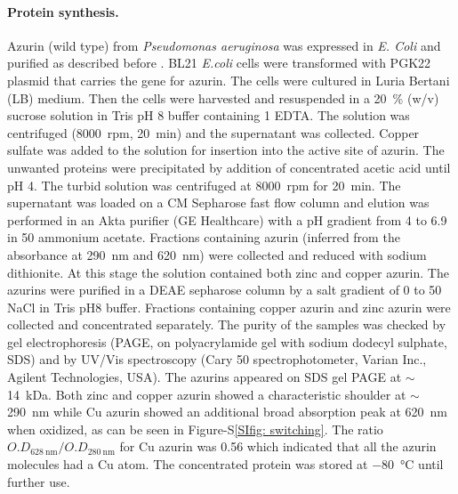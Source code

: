 \documentclass[journal=jacsat,manuscript=article]{achemso}
\begin{document}
\paragraph*{Protein synthesis.}
Azurin (wild type) from \textit{Pseudomonas aeruginosa} was expressed in \textit{E. Coli} and purified as described before \citep{kamp1990purification}.
BL21 \textit{E.coli} cells were transformed with PGK22 plasmid that carries the gene for azurin.
The cells were cultured in Luria Bertani (LB) medium.
Then the cells were harvested and resuspended in a \SI{20}{\percent} (w/v) sucrose solution in Tris pH 8 buffer containing \SI{1}{\mM} EDTA.
The solution was centrifuged (\SI{8000}{ rpm}, \SI{20}{\minute}) and the supernatant was collected.
Copper sulfate was added to the solution for insertion into the active site of azurin.
The unwanted proteins were precipitated by addition of concentrated acetic acid until pH 4. 
The turbid solution was centrifuged at \SI{8000}{ rpm} for \SI{20}{\minute}.
The supernatant was loaded on a CM Sepharose fast flow column and elution was performed in an Akta purifier (GE Healthcare) with a pH gradient from 4 to 6.9 in 
\SI{50}{\mM} ammonium acetate.
Fractions containing azurin (inferred from the absorbance at \SI{290}{\nm} and \SI{620}{\nm}) were collected and reduced with sodium dithionite.
At this stage the solution contained both zinc and copper azurin.
The azurins were purified in a DEAE sepharose column by a salt gradient of 0 to \SI{50}{\mM} NaCl in Tris pH8 buffer. 
Fractions containing copper azurin and zinc azurin were collected and concentrated separately.
The purity of the samples was checked by gel electrophoresis (PAGE, on polyacrylamide gel with sodium dodecyl sulphate, SDS) and by UV/Vis spectroscopy (Cary 50 spectrophotometer, Varian Inc., Agilent Technologies, USA).
The azurins appeared on SDS gel PAGE at $\sim$\SI{14}{ kDa}.
Both zinc and copper azurin showed a characteristic shoulder at ${\sim}$\SI{290}{\nm} while Cu azurin showed an additional 
broad absorption peak at \SI{620}{\nm} when oxidized, as can be seen in Figure-S\ref{SIfig: switching}. 
The ratio $O.D_{\SI{628}{\nm}}/O.D_{\SI{280}{\nm}}$ for Cu azurin was 0.56 which indicated that all the azurin molecules had a Cu atom. 
The concentrated protein was stored at \SI{-80}{\celsius} until further use.
\end{document}
